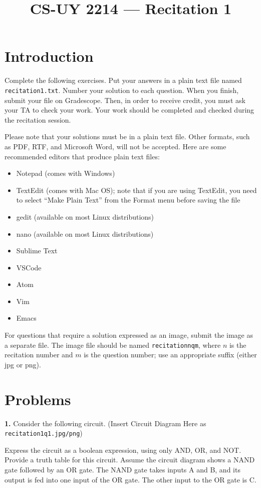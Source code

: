 \documentclass{article}
\title{CS-UY 2214 — Recitation 1}
\date{}
\begin{document}
\maketitle

\section*{Introduction}
Complete the following exercises. Put your answers in a plain text file named \texttt{recitation1.txt}. Number your solution to each question. When you finish, submit your file on Gradescope. Then, in order to receive credit, you must ask your TA to check your work. Your work should be completed and checked during the recitation session.

Please note that your solutions must be in a plain text file. Other formats, such as PDF, RTF, and Microsoft Word, will not be accepted. Here are some recommended editors that produce plain text files:
\begin{itemize}
    \item Notepad (comes with Windows)
    \item TextEdit (comes with Mac OS); note that if you are using TextEdit, you need to select “Make Plain Text” from the Format menu before saving the file
    \item gedit (available on most Linux distributions)
    \item nano (available on most Linux distributions)
    \item Sublime Text
    \item VSCode
    \item Atom
    \item Vim
    \item Emacs
\end{itemize}

For questions that require a solution expressed as an image, submit the image as a separate file. The image file should be named \texttt{recitationnqm}, where $n$ is the recitation number and $m$ is the question number; use an appropriate suffix (either jpg or png).

\section*{Problems}
\noindent\textbf{1.} Consider the following circuit.  (Insert Circuit Diagram Here as \texttt{recitation1q1.jpg/png})

Express the circuit as a boolean expression, using only AND, OR, and NOT. Provide a truth table for this circuit.  Assume the circuit diagram shows a NAND gate followed by an OR gate. The NAND gate takes inputs A and B, and its output is fed into one input of the OR gate. The other input to the OR gate is C.
\end{document}

